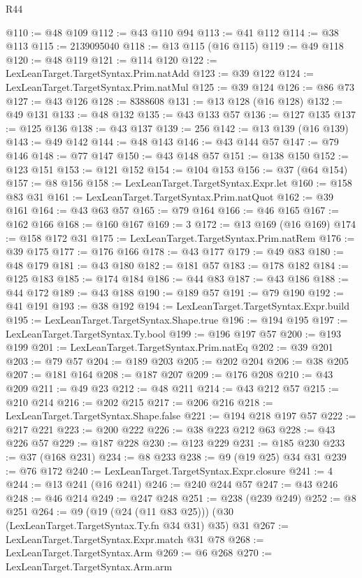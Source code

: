 \begin{lexlean}{R44}
\begin{coremodule}
@110 := @48 @109
@112 := @43 @110 @94
@113 := @41 @112
@114 := @38 @113
@115 := 2139095040
@118 := @13 @115 (@16 @115)
@119 := @49 @118
@120 := @48 @119
@121 := @114 @120
@122 := LexLeanTarget.TargetSyntax.Prim.natAdd
@123 := @39 @122
@124 := LexLeanTarget.TargetSyntax.Prim.natMul
@125 := @39 @124
@126 := @86 @73
@127 := @43 @126
@128 := 8388608
@131 := @13 @128 (@16 @128)
@132 := @49 @131
@133 := @48 @132
@135 := @43 @133 @57
@136 := @127 @135
@137 := @125 @136
@138 := @43 @137
@139 := 256
@142 := @13 @139 (@16 @139)
@143 := @49 @142
@144 := @48 @143
@146 := @43 @144 @57
@147 := @79 @146
@148 := @77 @147
@150 := @43 @148 @57
@151 := @138 @150
@152 := @123 @151
@153 := @121 @152
@154 := @104 @153
@156 := @37 (@64 @154)
@157 := @8 @156
@158 := LexLeanTarget.TargetSyntax.Expr.let
@160 := @158 @83 @31
@161 := LexLeanTarget.TargetSyntax.Prim.natQuot
@162 := @39 @161
@164 := @43 @63 @57
@165 := @79 @164
@166 := @46 @165
@167 := @162 @166
@168 := @160 @167
@169 := 3
@172 := @13 @169 (@16 @169)
@174 := @158 @172 @31
@175 := LexLeanTarget.TargetSyntax.Prim.natRem
@176 := @39 @175
@177 := @176 @166
@178 := @43 @177
@179 := @49 @83
@180 := @48 @179
@181 := @43 @180
@182 := @181 @57
@183 := @178 @182
@184 := @125 @183
@185 := @174 @184
@186 := @44 @83
@187 := @43 @186
@188 := @44 @172
@189 := @43 @188
@190 := @189 @57
@191 := @79 @190
@192 := @41 @191
@193 := @38 @192
@194 := LexLeanTarget.TargetSyntax.Expr.build
@195 := LexLeanTarget.TargetSyntax.Shape.true
@196 := @194 @195
@197 := LexLeanTarget.TargetSyntax.Ty.bool
@199 := @196 @197 @57
@200 := @193 @199
@201 := LexLeanTarget.TargetSyntax.Prim.natEq
@202 := @39 @201
@203 := @79 @57
@204 := @189 @203
@205 := @202 @204
@206 := @38 @205
@207 := @181 @164
@208 := @187 @207
@209 := @176 @208
@210 := @43 @209
@211 := @49 @23
@212 := @48 @211
@214 := @43 @212 @57
@215 := @210 @214
@216 := @202 @215
@217 := @206 @216
@218 := LexLeanTarget.TargetSyntax.Shape.false
@221 := @194 @218 @197 @57
@222 := @217 @221
@223 := @200 @222
@226 := @38 @223 @212 @63
@228 := @43 @226 @57
@229 := @187 @228
@230 := @123 @229
@231 := @185 @230
@233 := @37 (@168 @231)
@234 := @8 @233
@238 := @9 (@19 @25) @34 @31
@239 := @76 @172
@240 := LexLeanTarget.TargetSyntax.Expr.closure
@241 := 4
@244 := @13 @241 (@16 @241)
@246 := @240 @244 @57
@247 := @43 @246
@248 := @46 @214
@249 := @247 @248
@251 := @238 (@239 @249)
@252 := @8 @251
@264 := @9 (@19 (@24 (@11 @83 @25))) (@30 (LexLeanTarget.TargetSyntax.Ty.fn @34 @31) @35) @31
@267 := LexLeanTarget.TargetSyntax.Expr.match @31 @78
@268 := LexLeanTarget.TargetSyntax.Arm
@269 := @6 @268
@270 := LexLeanTarget.TargetSyntax.Arm.arm

\end{coremodule}
\end{lexlean}
